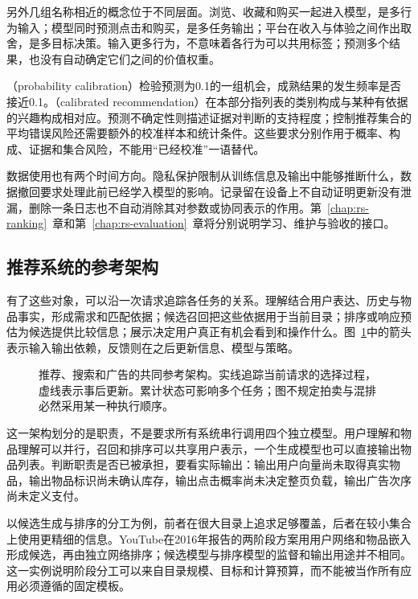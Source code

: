 另外几组名称相近的概念位于不同层面。浏览、收藏和购买一起进入模型，是多行为输入；模型同时预测点击和购买，是多任务输出；平台在收入与体验之间作出取舍，是多目标决策。输入更多行为，不意味着各行为可以共用标签；预测多个结果，也没有自动确定它们之间的价值权重。

（probability calibration）检验预测为0.1的一组机会，成熟结果的发生频率是否接近0.1。（calibrated recommendation）在本部分指列表的类别构成与某种有依据的兴趣构成相对应。预测不确定性则描述证据对判断的支持程度；控制推荐集合的平均错误风险还需要额外的校准样本和统计条件。这些要求分别作用于概率、构成、证据和集合风险，不能用“已经校准”一语替代。

数据使用也有两个时间方向。隐私保护限制从训练信息及输出中能够推断什么，数据撤回要求处理此前已经学入模型的影响。记录留在设备上不自动证明更新没有泄漏，删除一条日志也不自动消除其对参数或协同表示的作用。第~\ref{chap:rs-ranking}~章和第~\ref{chap:rs-evaluation}~章将分别说明学习、维护与验收的接口。

\subsection{推荐系统的参考架构}
\label{sec:rs-reference-architecture-concept}

有了这些对象，可以沿一次请求追踪各任务的关系。理解结合用户表达、历史与物品事实，形成需求和匹配依据；候选召回把这些依据用于当前目录；排序或响应预估为候选提供比较信息；展示决定用户真正有机会看到和操作什么。图~\ref{fig:rs-reference-architecture}中的箭头表示输入输出依赖，反馈则在之后更新信息、模型与策略。

\begin{figure}[htbp]
  \centering
  
  \caption{推荐、搜索和广告的共同参考架构。实线追踪当前请求的选择过程，虚线表示事后更新。累计状态可影响多个任务；图不规定拍卖与混排必然采用某一种执行顺序。}
  \label{fig:rs-reference-architecture}
\end{figure}

这一架构划分的是职责，不是要求所有系统串行调用四个独立模型。用户理解和物品理解可以并行，召回和排序可以共享用户表示，一个生成模型也可以直接输出物品列表。判断职责是否已被承担，要看实际输出：输出用户向量尚未取得真实物品，输出物品标识尚未确认库存，输出点击概率尚未决定整页负载，输出广告次序尚未定义支付。

以候选生成与排序的分工为例，前者在很大目录上追求足够覆盖，后者在较小集合上使用更精细的信息。YouTube在2016年报告的两阶段方案用用户网络和物品嵌入形成候选，再由独立网络排序；候选模型与排序模型的监督和输出用途并不相同。这一实例说明阶段分工可以来自目录规模、目标和计算预算，而不能被当作所有应用必须遵循的固定模板。

